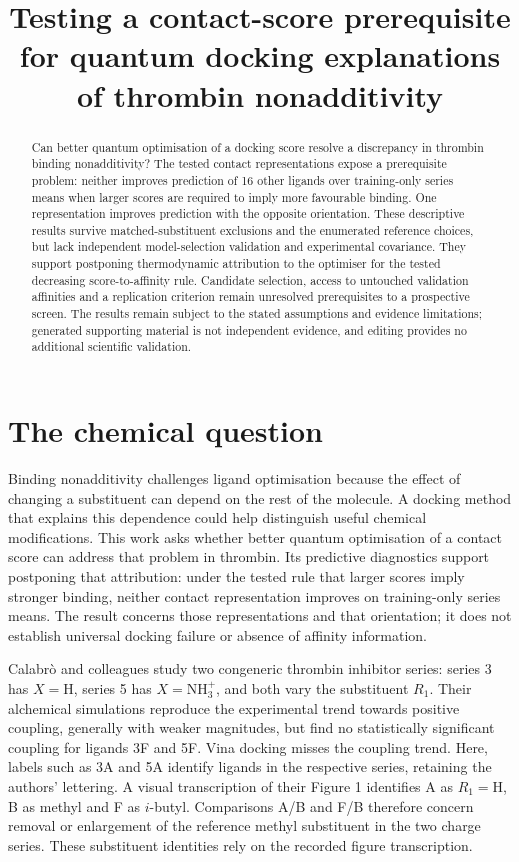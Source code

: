 \documentclass{article}
\title{Testing a contact-score prerequisite for quantum docking explanations of thrombin nonadditivity}
\begin{document}
\maketitle

\begin{abstract}
Can better quantum optimisation of a docking score resolve a discrepancy in thrombin binding nonadditivity? The tested contact representations expose a prerequisite problem: neither improves prediction of 16 other ligands over training-only series means when larger scores are required to imply more favourable binding. One representation improves prediction with the opposite orientation. These descriptive results survive matched-substituent exclusions and the enumerated reference choices, but lack independent model-selection validation and experimental covariance. They support postponing thermodynamic attribution to the optimiser for the tested decreasing score-to-affinity rule. Candidate selection, access to untouched validation affinities and a replication criterion remain unresolved prerequisites to a prospective screen. The results remain subject to the stated assumptions and evidence limitations; generated supporting material is not independent evidence, and editing provides no additional scientific validation.
\end{abstract}

\section{The chemical question}

Binding nonadditivity challenges ligand optimisation because the effect of changing a substituent can depend on the rest of the molecule. A docking method that explains this dependence could help distinguish useful chemical modifications. This work asks whether better quantum optimisation of a contact score can address that problem in thrombin. Its predictive diagnostics support postponing that attribution: under the tested rule that larger scores imply stronger binding, neither contact representation improves on training-only series means. The result concerns those representations and that orientation; it does not establish universal docking failure or absence of affinity information.

Calabr\`o and colleagues study two congeneric thrombin inhibitor series: series 3 has \(X=\mathrm{H}\), series 5 has \(X=\mathrm{NH}_3^+\), and both vary the substituent \(R_1\). Their alchemical simulations reproduce the experimental trend towards positive coupling, generally with weaker magnitudes, but find no statistically significant coupling for ligands 3F and 5F. Vina docking misses the coupling trend.\cite{Q} Here, labels such as 3A and 5A identify ligands in the respective series, retaining the authors' lettering. A visual transcription of their Figure 1 identifies A as \(R_1=\mathrm{H}\), B as methyl and F as \(i\)-butyl. Comparisons A/B and F/B therefore concern removal or enlargement of the reference methyl substituent in the two charge series. These substituent identities rely on the recorded figure transcription.
\end{document}
